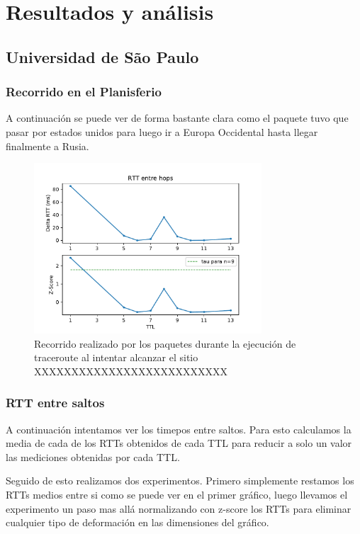 \section{Resultados y análisis}

\subsection*{Universidad de São Paulo}

\subsubsection*{Recorrido en el Planisferio}

A continuación se puede ver de forma bastante clara como el paquete tuvo que pasar por estados unidos para luego ir a Europa Occidental hasta llegar finalmente a Rusia.

\begin{figure}[H]
  \centering
  \includegraphics[width=8.5cm]{figs/traceroute-saopaulo.pdf}
  \caption{\normalfont Recorrido realizado por los paquetes durante la ejecución de traceroute al intentar alcanzar el sitio XXXXXXXXXXXXXXXXXXXXXXXXXX}
\end{figure}

\subsubsection*{RTT entre saltos}

A continuación intentamos ver los timepos entre saltos. Para esto calculamos la media de cada de los RTTs obtenidos de cada TTL para reducir a solo un valor las mediciones obtenidas por cada TTL. 

Seguido de esto realizamos dos experimentos. Primero simplemente restamos los RTTs medios entre si como se puede ver en el primer gráfico, luego llevamos el experimento un paso mas allá normalizando con z-score los RTTs para eliminar cualquier tipo de deformación en las dimensiones del gráfico.

